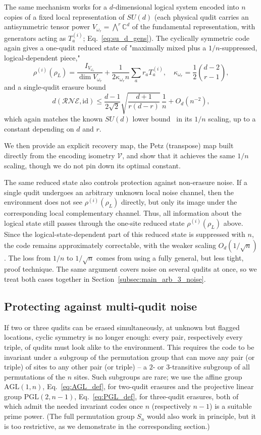 \documentclass[10pt,twocolumn,superscriptaddress,aps,amsmath,amssymb,citeautoscript,floatfix,prx]{revtex4-2}
\theoremstyle{plain}
\theoremstyle{plain}
\theoremstyle{plain}
\theoremstyle{plain}
\theoremstyle{plain}
\theoremstyle{plain}
\theoremstyle{plain}
\theoremstyle{definition}
\theoremstyle{plain}
\begin{document}
The same mechanism works for a $d$-dimensional logical system encoded into $n$ copies of a fixed local representation of $SU(d)$ (each physical qudit carries an antisymmetric tensor power $V_{\omega_r}=\bigwedge^r\mathbb C^d$ of the fundamental representation, 
with generators acting as $T_a^{(i)}$; Eq.~\eqref{eq:su_d_gens}). The cyclically symmetric code again gives a one-qudit reduced state of "maximally mixed plus a $1/n$-suppressed, logical-dependent piece,"
$$
\rho^{(i)}(\rho_L)=\frac{I_{V_{\omega_r}}}{\dim V_{\omega_r}}+\frac{1}{2\kappa_{\omega_r}n}\sum_a r_aT_a^{(i)},\quad \kappa_{\omega_r}=\frac12\binom{d-2}{r-1},
$$
and a single-qudit erasure bound
$$
d(\mathcal R\mathcal N\mathcal E,\mathrm{id})\le \frac{d-1}{2\sqrt2}\sqrt{\frac{d+1}{r(d-r)}}\,\frac1n+O_{d}(n^{-2}),
$$
which again matches the known $SU(d)$ lower bound~\cite{Faist2020} in its $1/n$ scaling, up to a constant depending on $d$ and $r$.
 
We then provide an explicit recovery map, the Petz (transpose) map built directly from the encoding isometry $\mathcal{V}$, and show that it achieves the same $1/n$ scaling, though we do not pin down its optimal constant.
 
The same reduced state also controls protection against non-erasure noise. If a single qudit undergoes an arbitrary unknown local noise channel, then the environment does not see $\rho^{(i)}(\rho_L)$ directly, 
but only its image under the corresponding local complementary channel. Thus, all information about the logical state still passes through the one-site reduced state $\rho^{(i)}(\rho_L)$ above. Since the logical-state-dependent part of this reduced state is suppressed with $n$, the code remains approximately correctable, with the weaker scaling $O_{d}(1/\sqrt n)$. The loss from $1/n$ to $1/\sqrt n$ comes from using a fully general, but less tight, proof technique. The same argument covers noise on several qudits at once, so we treat both cases together in Section~\ref{subsec:main_arb_3_noise}.
 
\subsection{Protecting against multi-qudit noise}\label{subsec:summary_multierasure}
 
If two or three qudits can be erased simultaneously, at unknown but flagged locations, cyclic symmetry is no longer enough: every pair, respectively every triple, of qudits must look alike to the environment. 
This requires the code to be invariant under a subgroup of the permutation group that can move any pair (or triple) of sites to any other pair (or triple) -- a $2$- or $3$-transitive subgroup of all permutations of the $n$ sites. 
Such subgroups are rare; we use the affine group $\mathrm{AGL}(1,n)$, Eq.~\eqref{eq:AGL_def}, for two-qudit erasures and the projective linear group $\mathrm{PGL}(2,n-1)$, Eq.~\eqref{eq:PGL_def}, 
for three-qudit erasures, both of which admit the needed invariant codes once $n$ (respectively $n-1$) is a suitable prime power. 
(The full permutation group $S_n$ would also work in principle, but it is too restrictive, as we demonstrate in the corresponding section.)
 
\end{document}
